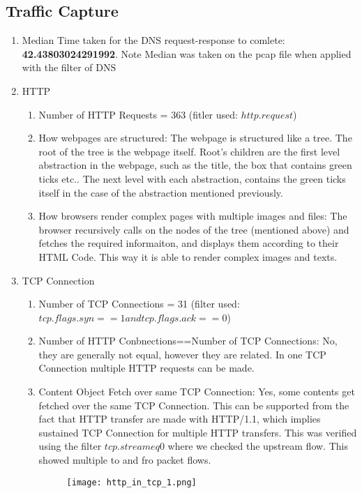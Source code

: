 \documentclass[12pt]{article}
\begin{document}
\subsection{Traffic Capture}
\renewcommand{\labelenumi}{\Alph{enumi}}
\begin{enumerate}
    \item Median Time taken for the DNS request-response to comlete: \textbf{42.43803024291992}. Note Median was taken on the pcap file when applied with the filter of DNS
    \item HTTP
    \begin{enumerate}
        \item Number of HTTP Requests = 363 (fitler used: $http.request$)
        \item How webpages are structured: The webpage is structured like a tree. The root of the tree is the webpage itself. Root's children are the first level abstraction in the webpage, such as the title, the box that contains green ticks etc.. The next level with each abstraction, contains the green ticks itself in the case of the abstraction mentioned previously. 
        \item How browsers render complex pages with multiple images and files: The browser recursively calls on the nodes of the tree (mentioned above) and fetches the required informaiton, and displays them according to their HTML Code. This way it is able to render complex images and texts. 
    \end{enumerate}
    \item TCP Connection
    \begin{enumerate}
        \item Number of TCP Connections = 31 (filter used: $tcp.flags.syn == 1 and tcp.flags.ack == 0$)
        \item Number of HTTP Conbnections==Number of TCP Connections: No, they are generally not equal, however they are related. In one TCP Connection multiple HTTP requests can be made.
        \item Content Object Fetch over same TCP Connection: Yes, some contents get fetched over the same TCP Connection. This can be supported from the fact that HTTP transfer are made with HTTP/1.1, which implies sustained TCP Connection for multiple HTTP transfers. This was verified using the filter $tcp.stream eq 0$ where we checked the upstream flow. This showed multiple to and fro packet flows.
        \begin{figure}[h!]
            \centering
            \texttt{[image: http\_in\_tcp\_1.png]}

\end{figure}
\end{enumerate}
\end{enumerate}
\end{document}
